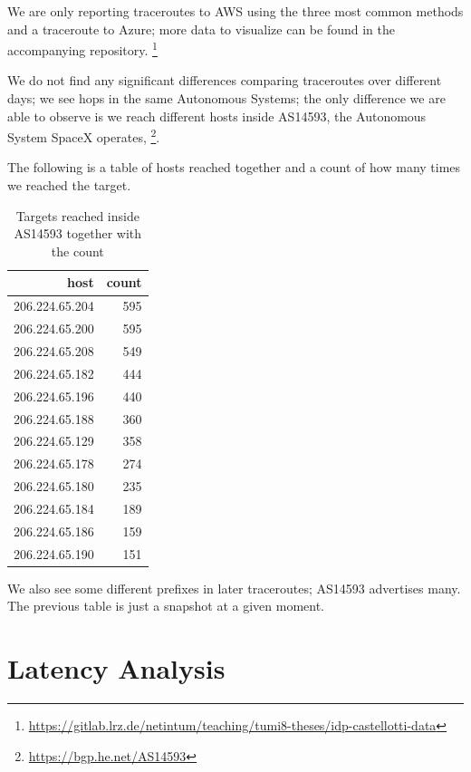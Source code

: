 \documentclass[IN,11pt,twoside,openright,idp,english]{tumthesis}
\begin{document}
We are only reporting traceroutes to AWS using the three most common methods and a traceroute to Azure; more data to visualize can be found in the accompanying repository. \footnote{\url{https://gitlab.lrz.de/netintum/teaching/tumi8-theses/idp-castellotti-data}}
    
We do not find any significant differences comparing traceroutes over different days; we see hops in the same Autonomous Systems; the only difference we are able to observe is we reach different hosts inside AS14593, the Autonomous System SpaceX operates, \footnote{\url{https://bgp.he.net/AS14593}}.
    
The following is a table of hosts reached together and a count of how many times we reached the target.
    
\begin{table}[]
    \centering
    \begin{tabular}{ r r }
        \toprule
            host           & count \\ 
            \midrule
            206.224.65.204 & 595   \\
            206.224.65.200 & 595   \\
            206.224.65.208 & 549   \\ 
            206.224.65.182 & 444   \\
            206.224.65.196 & 440   \\ 
            206.224.65.188 & 360   \\ 
            206.224.65.129 & 358   \\ 
            206.224.65.178 & 274   \\ 
            206.224.65.180 & 235   \\ 
            206.224.65.184 & 189   \\ 
            206.224.65.186 & 159   \\ 
            206.224.65.190 & 151   \\
            \bottomrule
    \end{tabular}
    \caption{Targets reached inside AS14593 together with the count}
\end{table}
    
We also see some different prefixes in later traceroutes; AS14593 advertises many. The previous table is just a snapshot at a given moment.
    
\section{Latency Analysis}
\end{document}
